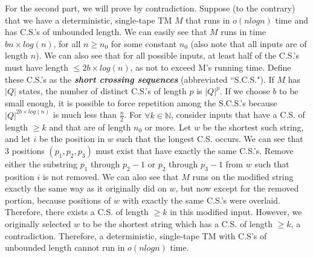 \begin{enumerate}
\par For the second part, we will prove by contradiction. Suppose (to the contrary) that we have a deterministic, single-tape TM $M$ that runs in $o(n log n)$ time and has C.S.'s of unbounded length. We can easily see that $M$ runs in time $bn \times log(n)$, for all $n \ge n_0$ for some constant $n_0$ (also note that all inputs are of length $n$). We can also see that for all possible inputs, at least half of the C.S.'s must have length $\le 2b \times log(n)$, as not to exceed M's running time. Define these C.S.'s as the \textbf{\emph{short crossing sequences}} (abbreviated ``S.C.S."). If $M$ has $|Q|$ states, the number of distinct C.S.'s of length $p$ is $|Q|^p$. If we choose $b$ to be small enough, it is possible to force repetition among the S.C.S.'s because $|Q|^{2b\times log(n)}$ is much less than $\frac{n}{2}$. For $\forall k \in \mathbb{N}$, consider inputs that have a C.S. of length $\ge k$ and that are of length $n_0$ or more. Let $w$ be the shortest such string, and let $i$ be the position in $w$ such that the longest C.S. occurs. We can see that 3 positions $(p_1, p_2, p_3)$ must exist that have exactly the same C.S.'s. Remove either the substring $p_1$ through $p_2-1$ or $p_2$ through $p_3-1$ from $w$ such that position $i$ is not removed. We can also see that $M$ runs on the modified string exactly the same way as it originally did on $w$, but now except for the removed portion, because positions of $w$ with exactly the same C.S.'s were overlaid. Therefore, there exists a C.S. of length $\ge k$ in this modified input. However, we originally selected $w$ to be the shortest string which has a C.S. of length $\ge k$, a contradiction. Therefore, a deterministic, single-tape TM with C.S's of unbounded length cannot run in $o(n log n)$ time.


\end{enumerate}